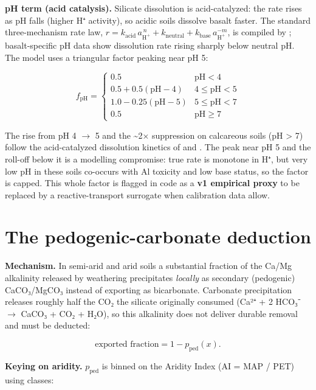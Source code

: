 \documentclass[openany]{book}
\begin{document}
\textbf{pH term (acid catalysis).} Silicate dissolution is acid-catalyzed: the
rate rises as pH falls (higher H⁺ activity), so acidic soils dissolve basalt
faster. The standard three-mechanism rate law,
\(r = k_{\text{acid}}\,a_{\text{H}^+}^{\,n} + k_{\text{neutral}} + k_{\text{base}}\,a_{\text{H}^+}^{-m}\),
is compiled by \citet{palandri2004}; basalt-specific pH data
\citep{gislason2003, gudbrandsson2011} show dissolution rate rising sharply
below neutral pH. The model uses a triangular factor peaking near pH 5:

\[
f_{\text{pH}} =
\begin{cases}
0.5 & \text{pH} < 4\\
0.5 + 0.5(\text{pH}-4) & 4 \le \text{pH} < 5\\
1.0 - 0.25(\text{pH}-5) & 5 \le \text{pH} < 7\\
0.5 & \text{pH} \ge 7
\end{cases}
\]

The rise from pH 4 \(\rightarrow\) 5 and the \textasciitilde2× suppression on
calcareous soils (pH \textgreater{} 7) follow the acid-catalyzed dissolution
kinetics of \citet{whitebrantley2003} and \citet{brantley2008}. The peak near pH
5 and the roll-off below it is a modelling compromise: true rate is monotone in
H⁺, but very low pH in these soils co-occurs with Al toxicity and low base
status, so the factor is capped. This whole factor is flagged in code as a
\textbf{v1 empirical proxy} to be replaced by a reactive-transport surrogate
\citep{kanzaki2023} when calibration data allow.

\chapter{The pedogenic-carbonate deduction}\label{ch:pedogenic}

\textbf{Mechanism.} In semi-arid and arid soils a substantial fraction of the
Ca/Mg alkalinity released by weathering precipitates \emph{locally} as secondary
(pedogenic) CaCO₃/MgCO₃ instead of exporting as bicarbonate. Carbonate
precipitation releases roughly half the CO₂ the silicate originally consumed
(Ca²⁺ + 2 HCO₃⁻ \(\rightarrow\) CaCO₃ + CO₂ + H₂O), so this alkalinity does not
deliver durable removal and must be deducted:

\[
\text{exported fraction} = 1 - p_{\text{ped}}(x).
\]

\textbf{Keying on aridity.} \(p_{\text{ped}}\) is binned on the Aridity Index
(AI = MAP / PET) using \citet{unep1992} classes:
\end{document}
